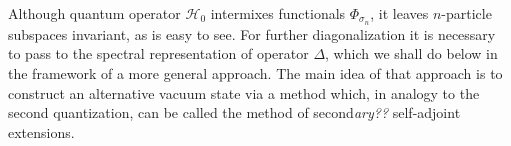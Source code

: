 \documentclass[12pt]{article}
\newcommand{\HH}{\mathscr{H}}
\begin{document}
	Although quantum operator
$ \HH_{0} $
	intermixes functionals
$ \Phi_{\sigma_{n}} $,
	it leaves
$ n $-particle subspaces invariant, as is easy to see.
	For further diagonalization it is necessary to pass
	to the spectral representation of operator
$ \Delta $,
	which we shall do below in the framework of a more general approach.
	The main idea of that approach is
	to construct an alternative vacuum state via a method
	which, in analogy to the second quantization, can be called
	the method of second{\it ary??} self-adjoint extensions.



\end{document}
